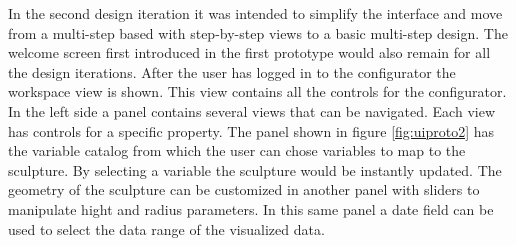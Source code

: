 \documentclass[../medieninformatik-arbeit.tex]{subfiles}
\begin{document}
In the second design iteration it was intended to simplify the interface and move from a multi-step based with step-by-step views to a basic multi-step design. The welcome screen first introduced in the first prototype would also remain for all the design iterations. After the user has logged in to the configurator the workspace view is shown. This view contains all the controls for the configurator. In the left side a panel contains several views that can be navigated. Each view has controls for a specific property. The panel shown in figure \ref{fig:uiproto2} has the variable catalog from which the user can chose variables to map to the sculpture. By selecting a variable the sculpture would be instantly updated. The geometry of the sculpture can be customized in another panel with sliders to manipulate hight and radius parameters. In this same panel a date field can be used to select the data range of the visualized data.
\end{document}
